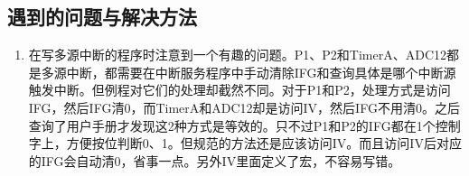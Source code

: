 \subsection{遇到的问题与解决方法}
\begin{enumerate}
	\item 在写多源中断的程序时注意到一个有趣的问题。P1、P2和TimerA、ADC12都是多源中断，都需要在中断服务程序中手动清除IFG和查询具体是哪个中断源触发中断。但例程对它们的处理却截然不同。对于P1和P2，处理方式是访问IFG，然后IFG清0，而TimerA和ADC12却是访问IV，然后IFG不用清0。之后查询了用户手册才发现这2种方式是等效的。只不过P1和P2的IFG都在1个控制字上，方便按位判断0、1。但规范的方法还是应该访问IV。而且访问IV后对应的IFG会自动清0，省事一点。另外IV里面定义了宏，不容易写错。
\end{enumerate}

